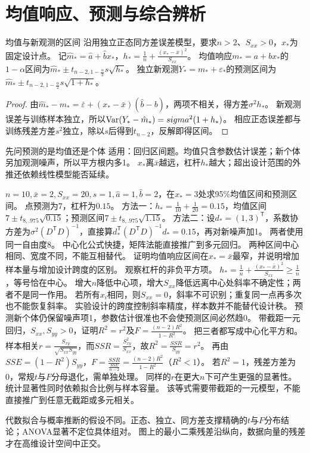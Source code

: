 \section{均值响应、预测与综合辨析}\label{sec:95}
\begin{theorem}{均值与新观测的区间}
沿用独立正态同方差误差模型，要求$n>2$、$S_{xx}>0$，$x_*$为固定设计点。
记$\hat m_* =\hat a+\hat bx_*$，$h_*=\frac{1}{n}+\frac{(x_*-\bar x)^2}{S_{xx}}$。
均值响应$m_*=a+bx_*$的$1-\alpha$区间为$\hat m_*\pm t_{n-2,1-\frac{\alpha}{2}}s\sqrt{h_*}$。
独立新观测$Y_*=m_*+\varepsilon_*$的预测区间为$\hat m_*\pm t_{n-2,1-\frac{\alpha}{2}}s\sqrt{1+h_*}$。
\end{theorem}
\begin{proof}
由$\hat m_*-m_*=\bar\varepsilon+(x_*-\bar x)(\hat b-b)$，两项不相关，得方差$\sigma^2h_*$。
新观测误差与训练样本独立，所以$\operatorname{Var}(Y_*-\hat m_*)=sigma^2(1+h_*)$。
相应正态误差都与训练残差方差$s^2$独立，除以$s$后得到$t_{n-2}$，反解即得区间。
\end{proof}
\begin{method}{先问预测的是均值还是个体}
适用：回归区间题。均值只含参数估计误差；新个体另加观测噪声，所以平方根内多1。
$x_*$离$\bar x$越远，杠杆$h_*$越大；超出设计范围的外推还依赖线性模型能否延续。
\end{method}
{$n=10,\bar x=2,S_{xx}=20,s=1,\hat a=1,\hat b=2$，在$x_*=3$处求95\%均值区间和预测区间。}
{点预测为7，杠杆为$0.15$。}
{方法一：$h_*=\frac{1}{10}+\frac{1}{20}=0.15$，均值区间$7\pm t_{8,.975}\sqrt{0.15}$；预测区间$7\pm t_{8,.975}\sqrt{1.15}$。
方法二：设$d_*=(1,3)^\mathsf T$，系数协方差为$\sigma^2(D^\mathsf TD)^{-1}$，直接算$d_*^\mathsf T(D^\mathsf TD)^{-1}d_*=0.15$，再对新噪声加1。
两者使用同一自由度8。}
{中心化公式快捷，矩阵法能直接推广到多元回归。}
{两种区间中心相同、宽度不同，不能互相替代。}
{证明均值响应区间在$x_*=\bar x$最窄，并说明增加样本量与增加设计跨度的区别。}
{观察杠杆的非负平方项。}
{$h_*=\frac{1}{n}+\frac{(x_*-\bar x)^2}{S_{xx}}\ge\frac{1}{n}$，等号恰在中心。
增大$n$降低中心项，增大$S_{xx}$降低远离中心处斜率不确定性；两者不是同一作用。
若所有$x_i$相同，则$S_{xx}=0$，斜率不可识别；重复同一点再多次也不能恢复斜率。}
{实验设计的跨度控制斜率精度，样本数并不能替代设计秩。}
{预测新个体仍保留噪声项1，参数估计很准也不会使预测区间必然趋0。}
{带截距一元回归，$S_{xx},S_{yy}>0$，证明$R^2=r^2$及$F=\frac{(n-2)R^2}{1-R^2}$。}
{把三者都写成中心化平方和。}
{样本相关$r=\frac{S_{xy}}{\sqrt{S_{xx}S_{yy}}}$，而$SSR=\frac{S_{xy}^2}{S_{xx}}$，故$R^2=\frac{SSR}{S_{yy}}=r^2$。
再由$SSE=(1-R^2)S_{yy}$，$F=\frac{SSR}{\frac{SSE}{n-2}}=\frac{(n-2)R^2}{1-R^2}$（$R^2<1$）。
若$R^2=1$，残差方差为0，常规$t\text{与}F$分母退化，需单独处理。
同样的$r$在更大$n$下可产生更强的显著性。}
{统计显著性同时依赖拟合比例与样本容量。}
{该等式需要带截距的一元模型，不能直接推广到任意无截距或多元相关。}
\begin{warning}
代数拟合与概率推断的假设不同。正态、独立、同方差支撑精确的$t$与$F$分布结论；ANOVA显著不定位具体组对。
图上的最小二乘残差沿纵向，数据向量的残差才在高维设计空间中正交。
\end{warning}

